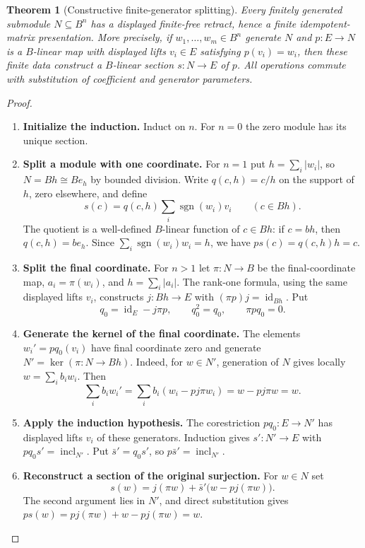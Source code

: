 \documentclass[11pt,a4paper]{article}
\numberwithin{algorithm}{section}
\numberwithin{equation}{section}
\newtheorem{theorem}{Theorem}[section]
\theoremstyle{definition}
\theoremstyle{remark}
\theoremstyle{plain}
\newcommand{\id}{\operatorname{id}}
\theoremstyle{definition}
\theoremstyle{plain}
\begin{document}
\begin{theorem}[Constructive finite-generator splitting]
\label{thm:finite-generator-splitting}
Every finitely generated submodule $N\subseteq B^n$ has a displayed
finite-free retract, hence a finite idempotent-matrix presentation.
More precisely, if $w_1,\ldots,w_m\in B^n$ generate $N$ and
$p:E\to N$ is a $B$-linear map with displayed lifts
$v_i\in E$ satisfying $p(v_i)=w_i$, then these finite data
construct a $B$-linear section $s:N\to E$ of $p$.
All operations commute with substitution of coefficient and
generator parameters.
\end{theorem}
\begin{proof}\leavevmode
\begin{enumerate}[leftmargin=*,align=left]
\item \textbf{Initialize the induction.}
Induct on $n$. For $n=0$ the zero module has its unique section.

\item \textbf{Split a module with one coordinate.}
For $n=1$ put $h=\sum_i|w_i|$, so $N=Bh\cong Be_h$ by
bounded division. Write $q(c,h)=c/h$ on the support of $h$,
zero elsewhere, and define
\[
 s(c)=q(c,h)\sum_i\operatorname{sgn}(w_i)v_i\qquad(c\in Bh).
\]
The quotient is a well-defined $B$-linear function of $c\in Bh$:
if $c=bh$, then $q(c,h)=be_h$. Since
$\sum_i\operatorname{sgn}(w_i)w_i=h$, we have
$ps(c)=q(c,h)h=c$.

\item \textbf{Split the final coordinate.}
For $n>1$ let $\pi:N\to B$ be the final-coordinate map,
$a_i=\pi(w_i)$, and $h=\sum_i|a_i|$. The rank-one formula,
using the same displayed lifts $v_i$, constructs
$j:Bh\to E$ with $(\pi p)j=\id_{Bh}$. Put
\[
 q_0=\id_E-j\pi p,\qquad q_0^2=q_0,\qquad \pi p q_0=0.
\]

\item \textbf{Generate the kernel of the final coordinate.}
The elements $w_i'=p q_0(v_i)$ have final coordinate zero and
generate $N'=\ker(\pi:N\to Bh)$. Indeed, for $w\in N'$, generation
of $N$ gives locally $w=\sum_i b_iw_i$. Then
\[
 \sum_i b_iw_i'
 =\sum_i b_i(w_i-pj\pi w_i)
 =w-pj\pi w=w.
\]

\item \textbf{Apply the induction hypothesis.}
The corestriction $p q_0:E\to N'$ has displayed lifts $v_i$
of these generators. Induction gives $s':N'\to E$ with
$p q_0s'=\operatorname{incl}_{N'}$. Put $\bar s'=q_0s'$,
so $p\bar s'=\operatorname{incl}_{N'}$.

\item \textbf{Reconstruct a section of the original surjection.}
For $w\in N$ set
\[
 s(w)=j(\pi w)+\bar s'\bigl(w-pj(\pi w)\bigr).
\]
The second argument lies in $N'$, and direct substitution gives
$ps(w)=pj(\pi w)+w-pj(\pi w)=w$.


\end{enumerate}
\end{proof}
\end{document}
